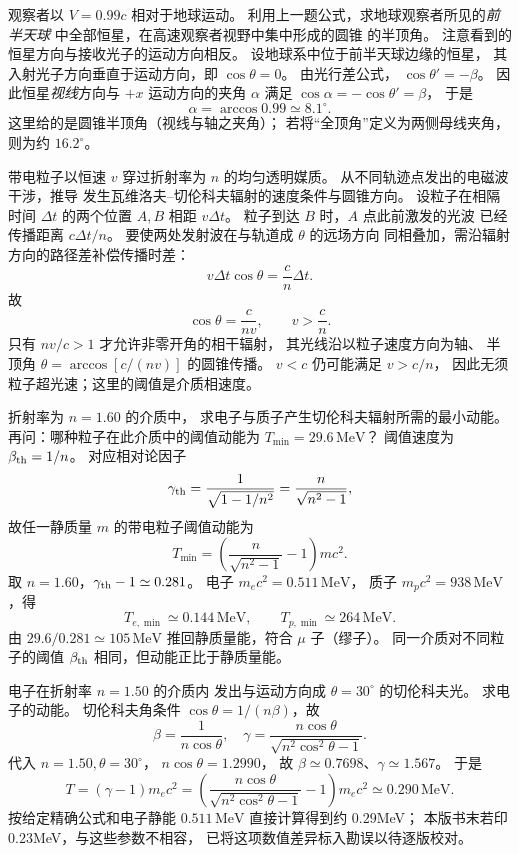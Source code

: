 观察者以 $V=0.99c$ 相对于地球运动。
利用上一题公式，求地球观察者所见的\emph{前半天球}
中全部恒星，在高速观察者视野中集中形成的圆锥
的半顶角。
\exsolution
注意看到的恒星方向与接收光子的运动方向相反。
设地球系中位于前半天球边缘的恒星，
其入射光子方向垂直于运动方向，即
$\cos\theta=0$。
由光行差公式，
$\cos\theta'=-\beta$。
因此恒星\emph{视线}方向与 $+x$ 运动方向的夹角
$\alpha$ 满足
$\cos\alpha=-\cos\theta'=\beta$，
于是
\[
 \boxed{\alpha=\arccos0.99\simeq8.1^\circ}.
\]
\excheck 这里给的是圆锥半顶角（视线与轴之夹角）；
若将“全顶角”定义为两侧母线夹角，则为约 $16.2^\circ$。

带电粒子以恒速 $v$ 穿过折射率为 $n$ 的均匀透明媒质。
从不同轨迹点发出的电磁波干涉，推导
发生瓦维洛夫--切伦科夫辐射的速度条件与圆锥方向。
\exsolution
设粒子在相隔时间 $\Delta t$ 的两个位置
$A,B$ 相距 $v\Delta t$。
粒子到达 $B$ 时，$A$ 点此前激发的光波
已经传播距离 $c\Delta t/n$。
要使两处发射波在与轨道成 $\theta$ 的远场方向
同相叠加，需沿辐射方向的路径差补偿传播时差：
\[
 v\Delta t\cos\theta=\frac cn\Delta t.
\]
故
\[
 \boxed{\cos\theta=\frac c{nv}},
 \qquad \boxed{v>\frac cn}.
\]
只有 $nv/c>1$ 才允许非零开角的相干辐射，
其光线沿以粒子速度方向为轴、
半顶角 $\theta=\arccos[c/(nv)]$ 的圆锥传播。
\excheck $v<c$ 仍可能满足 $v>c/n$，
因此无须粒子超光速；这里的阈值是介质相速度。

折射率为 $n=1.60$ 的介质中，
求电子与质子产生切伦科夫辐射所需的最小动能。
再问：哪种粒子在此介质中的阈值动能为
$T_{\min}=29.6\,\mathrm{MeV}$？
\exsolution
阈值速度为
$\beta_{\rm th}=1/n$。
对应相对论因子
\[
 \gamma_{\rm th}
 =\frac1{\sqrt{1-1/n^2}}
 =\frac n{\sqrt{n^2-1}},
\]
故任一静质量 $m$ 的带电粒子阈值动能为
\[
 \boxed{T_{\min}=
 \left(\frac n{\sqrt{n^2-1}}-1\right)mc^2}.
\]
取 $n=1.60$，$\gamma_{\rm th}-1\simeq0.281$。
电子 $m_ec^2=0.511\,\mathrm{MeV}$，
质子 $m_pc^2=938\,\mathrm{MeV}$，得
\[
 \boxed{T_{e,\min}\simeq0.144\,\mathrm{MeV}},\qquad
 \boxed{T_{p,\min}\simeq264\,\mathrm{MeV}}.
\]
由 $29.6/0.281\simeq105\,\mathrm{MeV}$
推回静质量能，符合 $\mu$ 子（缪子）。
\excheck 同一介质对不同粒子的阈值
$\beta_{\rm th}$ 相同，但动能正比于静质量能。

电子在折射率 $n=1.50$ 的介质内
发出与运动方向成 $\theta=30^\circ$
的切伦科夫光。
求电子的动能。
\exsolution
切伦科夫角条件
$\cos\theta=1/(n\beta)$，故
\[
 \boxed{\beta=\frac1{n\cos\theta}},
 \quad
 \boxed{\gamma=
 \frac{n\cos\theta}{\sqrt{n^2\cos^2\theta-1}}}.
\]
代入
$n=1.50,\theta=30^\circ$，
$n\cos\theta=1.2990$，
故 $\beta\simeq0.7698$、$\gamma\simeq1.567$。
于是
\[
 \boxed{T=(\gamma-1)m_ec^2
 =\left(\frac{n\cos\theta}
 {\sqrt{n^2\cos^2\theta-1}}-1\right)
 m_ec^2
 \simeq0.290\,\mathrm{MeV}}.
\]
\excheck 按给定精确公式和电子静能 $0.511\,\mathrm{MeV}$
直接计算得到约 $0.29$MeV；
本版书末若印 $0.23$MeV，与这些参数不相容，
已将这项数值差异标入勘误以待逐版校对。
